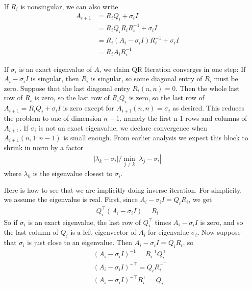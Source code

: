 \documentclass[11pt]{article}
\numberwithin{equation}{section}
\begin{document}
If $R_i$ is nonsingular, we can also write \begin{align*}
    A_{i+1} &= R_i Q_i + \sigma_i I \\
            &= R_i Q_iR_i R_i^{-1} + \sigma_i I \\
            &= R_i (A_i - \sigma_i I) R_i^{-1} + \sigma_i I \\
            &= R_i A_i R_i^{-1}
\end{align*}

If $\sigma_i$ is an exact eigenvalue of $A$, we claim QR Iteration converges in one step: 
If $A_i - \sigma_i I$ is singular, then $R_i$ is singular, so some diagonal entry of $R_i$ must be zero.
Suppose that the last diagonal entry $R_i(n,n) = 0$. Then the whole last row of $R_i$ is zero, so the last row of $R_iQ_i$ is zero,
so the last row of $A_{i+1} = R_i Q_i + \sigma_i I$ is zero except for $A_{i+1}(n,n) = \sigma_i$ as desired. This reduces the problem to one of dimension $n-1$, 
namely the first n-1 rows and columns of $A_{i+1}$. If $\sigma_i$ is not an exact eigenvalue, we declare convergence when $A_{i+1}(n,1:n-1)$ is small enough. 
From earlier analysis we expect this block to shrink in norm by a factor \begin{align*}
    | \lambda_k - \sigma_i | / \min_{j \neq k} | \lambda_j - \sigma_i  |
\end{align*}
where $\lambda_k$ is the eigenvalue closest to $\sigma_i$.

Here is how to see that we are implicitly doing inverse iteration. For simplicity, we assume the eigenvalue is real. First, 
since $A_i - \sigma_i I = Q_i R_i$, we get \begin{align*}
    Q_i^\top \left( A_i - \sigma_i I \right) = R_i
\end{align*}
So if $\sigma_i$ is an exact eigenvalue, the last row of $Q_i^\top$ times $A_i - \sigma_i I$ is zero, 
and so the last column of $Q_i$ is a left eigenvector of $A_i$ for eigenvalue $\sigma_i$. Now suppose that $\sigma_i$ is just close to an eigenvalue. 
Then $A_i - \sigma_i I = Q_i R_i$, so \begin{align*}
    & \left( A_i - \sigma_i I \right)^{-1} = R_i^{-1} Q_i^{\top} \\
    & \left(A_{i}-\sigma_{i} I\right)^{-\top}=Q_{i} R_{i}^{-\top} \\
    & \left(A_{i}- \sigma_{i} I\right)^{-\top} R_{i}^{\top}=Q_{i}
\end{align*}
\end{document}
